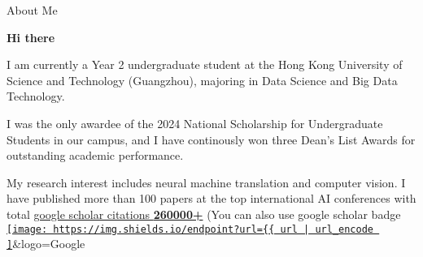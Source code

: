 \begin{section}{About Me}
\label{sec:about-me}

\begin{center}
\huge{\textbf{Hi there 👋}}
\end{center}

I am currently a Year 2 undergraduate student at the Hong Kong University of Science and Technology (Guangzhou), majoring in Data Science and Big Data Technology.

I was the only awardee of the 2024 National Scholarship for Undergraduate Students in our campus, and I have continously won three Dean's List Awards for outstanding academic performance.

My research interest includes neural machine translation and computer vision. I have published more than 100 papers at the top international AI conferences with total \href{https://scholar.google.com/citations?user=DhtAFkwAAAAJ}{google scholar citations \textbf{260000+}} (You can also use google scholar badge \href{https://scholar.google.com/citations?user=DhtAFkwAAAAJ}{\texttt{[image: https://img.shields.io/endpoint?url=\{\{ url | url\_encode ]}}&logo=Google%
\end{section} 